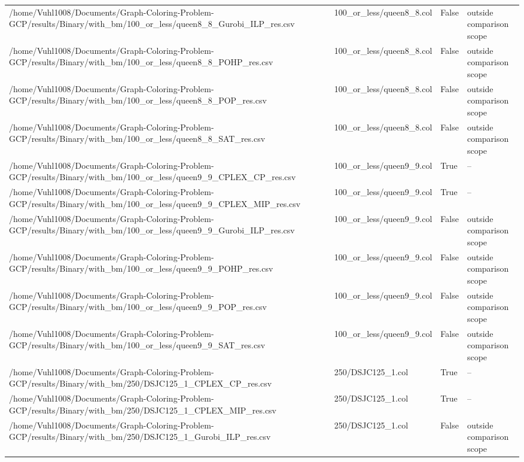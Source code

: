 \begin{table}[htbp]
\begin{tabular}{llll}
/home/Vuhl1008/Documents/Graph-Coloring-Problem-GCP/results/Binary/with\_bm/100\_or\_less/queen8\_8\_Gurobi\_ILP\_res.csv & 100\_or\_less/queen8\_8.col & False & outside comparison scope \\
/home/Vuhl1008/Documents/Graph-Coloring-Problem-GCP/results/Binary/with\_bm/100\_or\_less/queen8\_8\_POHP\_res.csv & 100\_or\_less/queen8\_8.col & False & outside comparison scope \\
/home/Vuhl1008/Documents/Graph-Coloring-Problem-GCP/results/Binary/with\_bm/100\_or\_less/queen8\_8\_POP\_res.csv & 100\_or\_less/queen8\_8.col & False & outside comparison scope \\
/home/Vuhl1008/Documents/Graph-Coloring-Problem-GCP/results/Binary/with\_bm/100\_or\_less/queen8\_8\_SAT\_res.csv & 100\_or\_less/queen8\_8.col & False & outside comparison scope \\
/home/Vuhl1008/Documents/Graph-Coloring-Problem-GCP/results/Binary/with\_bm/100\_or\_less/queen9\_9\_CPLEX\_CP\_res.csv & 100\_or\_less/queen9\_9.col & True & -- \\
/home/Vuhl1008/Documents/Graph-Coloring-Problem-GCP/results/Binary/with\_bm/100\_or\_less/queen9\_9\_CPLEX\_MIP\_res.csv & 100\_or\_less/queen9\_9.col & True & -- \\
/home/Vuhl1008/Documents/Graph-Coloring-Problem-GCP/results/Binary/with\_bm/100\_or\_less/queen9\_9\_Gurobi\_ILP\_res.csv & 100\_or\_less/queen9\_9.col & False & outside comparison scope \\
/home/Vuhl1008/Documents/Graph-Coloring-Problem-GCP/results/Binary/with\_bm/100\_or\_less/queen9\_9\_POHP\_res.csv & 100\_or\_less/queen9\_9.col & False & outside comparison scope \\
/home/Vuhl1008/Documents/Graph-Coloring-Problem-GCP/results/Binary/with\_bm/100\_or\_less/queen9\_9\_POP\_res.csv & 100\_or\_less/queen9\_9.col & False & outside comparison scope \\
/home/Vuhl1008/Documents/Graph-Coloring-Problem-GCP/results/Binary/with\_bm/100\_or\_less/queen9\_9\_SAT\_res.csv & 100\_or\_less/queen9\_9.col & False & outside comparison scope \\
/home/Vuhl1008/Documents/Graph-Coloring-Problem-GCP/results/Binary/with\_bm/250/DSJC125\_1\_CPLEX\_CP\_res.csv & 250/DSJC125\_1.col & True & -- \\
/home/Vuhl1008/Documents/Graph-Coloring-Problem-GCP/results/Binary/with\_bm/250/DSJC125\_1\_CPLEX\_MIP\_res.csv & 250/DSJC125\_1.col & True & -- \\
/home/Vuhl1008/Documents/Graph-Coloring-Problem-GCP/results/Binary/with\_bm/250/DSJC125\_1\_Gurobi\_ILP\_res.csv & 250/DSJC125\_1.col & False & outside comparison scope \\

\end{tabular}
\end{table}
